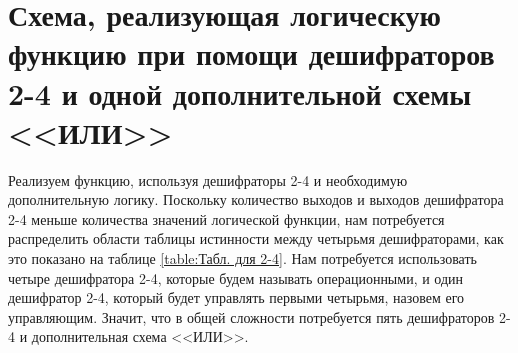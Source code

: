 \documentclass{mirea}
\begin{document}
\section{Схема, реализующая логическую функцию при помощи дешифраторов 2-4 и одной дополнительной схемы <<ИЛИ>>}
Реализуем функцию, используя дешифраторы 2-4 и необходимую дополнительную логику. Поскольку количество выходов и выходов дешифратора 2-4 меньше количества значений логической функции, нам потребуется распределить области таблицы истинности между четырьмя дешифраторами, как это показано на таблице \ref{table:Табл. для 2-4}. Нам потребуется использовать четыре дешифратора 2-4, которые будем называть операционными, и один дешифратор 2-4, который будет управлять первыми четырьмя, назовем его управляющим. Значит, что в общей сложности потребуется пять дешифраторов 2-4 и дополнительная схема <<ИЛИ>>.
\end{document}

